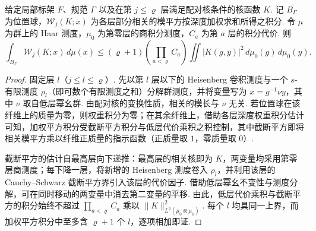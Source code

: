 \begin{lemma}[单标架的加权平方积分]
\label{lem:b-one-frame-weighted-integral}
\emitthmsource
给定局部标架 $F$、规范 $\Gamma$ 以及在第 $j\le\varrho$ 层满足配对核条件的核函数 $K$.
记 $B_\Gamma$ 为位置球，$\mathcal W_j(K;x)$ 为各层部分相关的模平方按深度加权求和所得之积分.
令 $\mu$ 为群上的 Haar 测度，$\mu_0$ 为第零层的商积分测度，$C_a$ 为第 $a$ 层的积分代价. 则
\[
 \int_{B_\Gamma}\mathcal W_j(K;x)\,d\mu(x)
 \le (\varrho+1)\left(\prod_{a<\varrho}C_a\right)
      \iint |K(g,y)|^2\,d\mu_0(g)\,d\mu_0(y).
\]
\end{lemma}

\begin{proof}
固定层 $l$（$j\le l\le\varrho$）. 先以第 $l$ 层以下的 Heisenberg 卷积测度与一个 $s$-有限测度 $\rho_l$（即可数个有限测度之和）分解群测度，并将变量写为 $x=g^{-1}\nu y$，其中 $\nu$ 取自低层幂幺群. 由配对核的变换性质，相关的模长与 $\nu$ 无关. 若位置球在该纤维上的质量为零，则权重积分为零；在其余纤维上，借助各层深度权重积分估计可知，加权平方积分受截断平方积分与低层代价乘积之积控制，其中截断平方即将相关模平方乘以纤维正质量的指示函数（正质量取 $1$，零质量取 $0$）.

截断平方的估计自最高层向下递推：最高层的相关核即为 $K$，两变量均采用第零层商测度；每下降一层，将新增的 Heisenberg 测度卷入 $\rho_l$，并利用该层的 Cauchy--Schwarz 截断平方界引入该层的代价因子. 借助低层幂幺不变性与测度分解，可在同时移动的两变量中消去第二变量的平移. 由此，低层代价乘积与截断平方的积分始终不超过 $\prod_{a<\varrho}C_a$ 乘以 $\|K\|_{L^2(\mu_0\otimes\mu_0)}^2$. 每个 $l$ 均具同一上界，而加权平方积分中至多含 $\varrho+1$ 个 $l$，逐项相加即证.
\end{proof}

